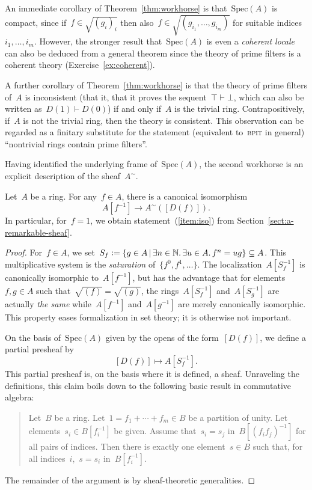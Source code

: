 \documentclass{ws-rv9x6}
\newcommand{\NN}{\mathbb{N}}
\newcommand{\defeq}{\vcentcolon=}
\newcommand{\Spec}{\mathrm{Spec}}
\renewcommand{\_}{\mathpunct{.}}
\newcommand{\?}{\,{:}\,}
\newcommand{\BPIT}{\textsc{bpit}\xspace}
\begin{document}
\begin{remark}An immediate corollary of Theorem~\ref{thm:workhorse} is
that~$\Spec(A)$ is compact, since if~$f \in \sqrt{(g_i)_i}$ then also~$f \in
\sqrt{(g_{i_1},\ldots,g_{i_m})}$ for suitable indices~$i_1,\ldots,i_m$.
However, the stronger result that~$\Spec(A)$ is
even a \emph{coherent locale} can also be deduced from a general theorem
since the theory of prime filters is a coherent theory
(Exercise~\ref{ex:coherent}).\end{remark}

\begin{remark}\label{rem:consistency}
A further corollary of Theorem~\ref{thm:workhorse} is that the theory of prime
filters of~$A$ is inconsistent (that it, that it proves the sequent~$\top
\vdash \bot$, which can also be written as~$D(1) \vdash D(0)$) if and only
if~$A$ is the trivial ring. Contrapositively, if~$A$ is not the trivial ring,
then the theory is consistent. This observation can be regarded as a finitary
substitute for the statement (equivalent to~\BPIT in general) ``nontrivial rings contain prime filters''.
\end{remark}

Having identified the underlying frame of~$\Spec(A)$, the second workhorse is
an explicit description of the sheaf~$A^\sim$.

\begin{proposition}\label{prop:identification}
Let~$A$ be a ring. For any~$f \in A$, there is a canonical isomorphism
\[ A[f^{-1}] \longrightarrow A^\sim([D(f)]). \]
In particular, for~$f = 1$, we obtain statement~(\ref{item:iso}) from
Section~\ref{sect:a-remarkable-sheaf}.
\end{proposition}

\begin{proof}For~$f \in A$, we set~$S_f \defeq \{ g \in A \,|\, \exists n \in
\NN\_ \exists u \in A\_ f^n = ug \} \subseteq A$. This multiplicative system is
the \emph{saturation} of~$\{ f^0, f^1, \ldots \}$. The localization~$A[S_f^{-1}]$
is canonically isomorphic to~$A[f^{-1}]$, but has the advantage that for
elements~$f,g \in A$ such that~$\sqrt{(f)} = \sqrt{(g)}$, the
rings~$A[S_f^{-1}]$ and~$A[S_g^{-1}]$ are actually \emph{the same}
while~$A[f^{-1}]$ and~$A[g^{-1}]$ are merely canonically isomorphic. This
property eases formalization in set theory; it is otherwise not important.

On the basis of~$\Spec(A)$ given by the opens of the form~$[D(f)]$, we define a partial
presheaf by
\[ [D(f)] \longmapsto A[S_f^{-1}]. \]
This partial presheaf is, on the basis where it is defined, a sheaf. Unraveling
the definitions, this claim boils down to the following basic result in
commutative algebra:
\begin{quote}
Let~$B$ be a ring. Let~$1 = f_1 + \cdots + f_m \in B$ be a partition of unity. Let
elements~$s_i \in B[f_i^{-1}]$ be given. Assume that~$s_i = s_j$
in~$B[(f_if_j)^{-1}]$ for all pairs of indices. Then there is exactly one
element~$s \in B$ such that, for all indices~$i$,~$s = s_i$ in~$B[f_i^{-1}]$.
\end{quote}
The remainder of the argument is by sheaf-theoretic generalities.
\end{proof}
\end{document}
